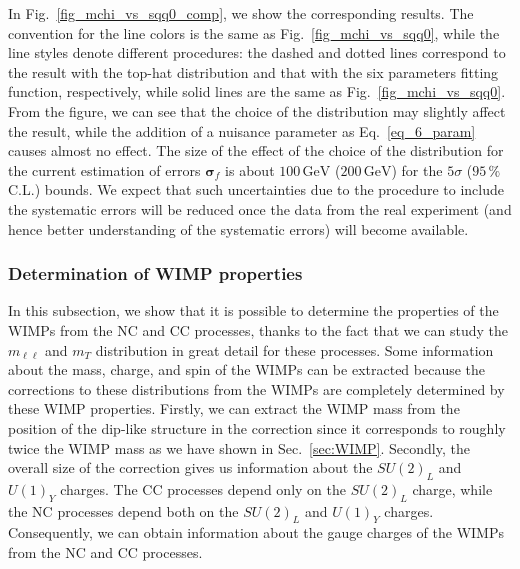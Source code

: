 \documentclass[12pt,twoside,book]{article}
\begin{document}
In Fig.~\ref{fig_mchi_vs_sqq0_comp}, we show the corresponding
results.  The convention for the line colors is the same as
Fig.~\ref{fig_mchi_vs_sqq0}, while the line styles denote different
procedures: the dashed and dotted lines correspond to the result with
the top-hat distribution and that with the six parameters fitting
function, respectively, while solid lines are the same as
Fig.~\ref{fig_mchi_vs_sqq0}.  From the figure, we can see that the
choice of the distribution may slightly affect the result, while the
addition of a nuisance parameter as Eq.~\eqref{eq_6_param} causes
almost no effect.  The size of the effect of the choice of the
distribution for the current estimation of errors $\bm{\sigma}_f$ is
about $100\,\mathrm{GeV}$ ($200\,\mathrm{GeV}$) for the $5\sigma$
($95\,\%$ C.L.) bounds.  We expect that such uncertainties due to the
procedure to include the systematic errors will be reduced once the
data from the real experiment (and hence better understanding of the
systematic errors) will become available.

\subsubsection{Determination of WIMP properties}
\label{sec_property}

In this subsection, we show that it is possible to determine the
properties of the WIMPs from the NC and CC processes, thanks to the
fact that we can study the $m_{\ell\ell}$ and $m_T$ distribution in
great detail for these processes.  Some information about the mass,
charge, and spin of the WIMPs can be extracted because the
corrections to these distributions from the WIMPs are completely
determined by these WIMP properties.  Firstly, we can extract the
WIMP mass from the position of the dip-like structure in the
correction since it corresponds to roughly twice the WIMP mass as we
have shown in Sec.~\ref{sec:WIMP}.  Secondly, the overall size of the
correction gives us information about the $SU(2)_L$ and $U(1)_Y$
charges.  The CC processes depend only on the $SU(2)_L$ charge, while
the NC processes depend both on the $SU(2)_L$ and $U(1)_Y$ charges.
Consequently, we can obtain information about the gauge charges of the
WIMPs from the NC and CC processes.
\end{document}
